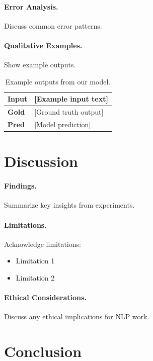 \documentclass[11pt]{article}
\begin{document}
\paragraph{Error Analysis.} Discuss common error patterns.

\paragraph{Qualitative Examples.} Show example outputs.

\begin{table}[t]
    \centering
    \caption{Example outputs from our model.}
    \label{tab:examples}
    \begin{tabular}{lp{5cm}}
        \toprule
        \textbf{Input} & [Example input text] \\
        \midrule
        \textbf{Gold} & [Ground truth output] \\
        \textbf{Pred} & [Model prediction] \\
        \bottomrule
    \end{tabular}
\end{table}

\section{Discussion}
\label{sec:discussion}

\paragraph{Findings.} Summarize key insights from experiments.

\paragraph{Limitations.} Acknowledge limitations:
\begin{itemize}
    \item Limitation 1
    \item Limitation 2
\end{itemize}

\paragraph{Ethical Considerations.} Discuss any ethical implications for NLP work.

\section{Conclusion}
\label{sec:conclusion}
\end{document}
